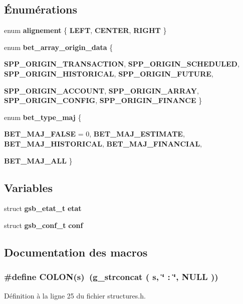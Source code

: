 \subsection*{Énumérations}
\begin{DoxyCompactItemize}
\item 
enum {\bf alignement} \{ {\bf LEFT}, 
{\bf CENTER}, 
{\bf RIGHT}
 \}
\item 
enum {\bf bet\_\-array\_\-origin\_\-data} \{ \par
{\bf SPP\_\-ORIGIN\_\-TRANSACTION}, 
{\bf SPP\_\-ORIGIN\_\-SCHEDULED}, 
{\bf SPP\_\-ORIGIN\_\-HISTORICAL}, 
{\bf SPP\_\-ORIGIN\_\-FUTURE}, 
\par
{\bf SPP\_\-ORIGIN\_\-ACCOUNT}, 
{\bf SPP\_\-ORIGIN\_\-ARRAY}, 
{\bf SPP\_\-ORIGIN\_\-CONFIG}, 
{\bf SPP\_\-ORIGIN\_\-FINANCE}
 \}
\item 
enum {\bf bet\_\-type\_\-maj} \{ \par
{\bf BET\_\-MAJ\_\-FALSE} =  0, 
{\bf BET\_\-MAJ\_\-ESTIMATE}, 
{\bf BET\_\-MAJ\_\-HISTORICAL}, 
{\bf BET\_\-MAJ\_\-FINANCIAL}, 
\par
{\bf BET\_\-MAJ\_\-ALL}
 \}
\end{DoxyCompactItemize}
\subsection*{Variables}
\begin{DoxyCompactItemize}
\item 
struct {\bf gsb\_\-etat\_\-t} {\bf etat}
\item 
struct {\bf gsb\_\-conf\_\-t} {\bf conf}
\end{DoxyCompactItemize}


\subsection{Documentation des macros}
\subsubsection[{COLON}]{\setlength{\rightskip}{0pt plus 5cm}\#define COLON(s)~(g\_\-strconcat ( s, \char`\"{} : \char`\"{}, NULL ))}\label{structures_8h_aaad3270d56994a956f6956f142c1c103}


Définition à la ligne 25 du fichier structures.h.

